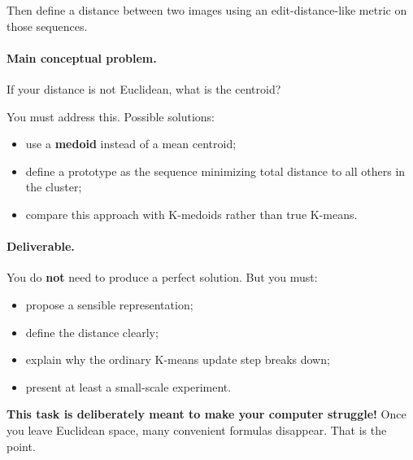 \documentclass[11pt]{article}
\begin{document}
Then define a distance between two images using an edit-distance-like metric on those sequences.

\paragraph{Main conceptual problem.}
If your distance is not Euclidean, what is the centroid?

You must address this. Possible solutions:
\begin{itemize}[itemsep=2pt]
    \item use a \textbf{medoid} instead of a mean centroid;
    \item define a prototype as the sequence minimizing total distance to all others in the cluster;
    \item compare this approach with K-medoids rather than true K-means.
\end{itemize}

\paragraph{Deliverable.}
You do \textbf{not} need to produce a perfect solution. But you must:
\begin{itemize}[itemsep=2pt]
    \item propose a sensible representation;
    \item define the distance clearly;
    \item explain why the ordinary K-means update step breaks down;
    \item present at least a small-scale experiment.
\end{itemize}

\begin{warningbox}
\textbf{This task is deliberately meant to make your computer struggle!}
Once you leave Euclidean space, many convenient formulas disappear.
That is the point.
\end{warningbox}



\end{document}
